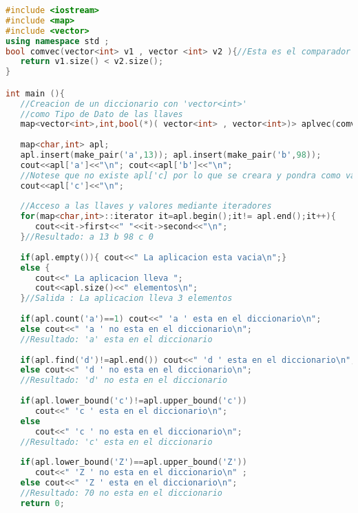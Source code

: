 \begin{lstlisting}[language=C++]
#include <iostream>
#include <map>
#include <vector>
using namespace std ;
bool comvec(vector<int> v1 , vector <int> v2 ){//Esta es el comparador
   return v1.size() < v2.size();
}

int main (){
   //Creacion de un diccionario con 'vector<int>' 
   //como Tipo de Dato de las llaves
   map<vector<int>,int,bool(*)( vector<int> , vector<int>)> aplvec(comvec);
   
   map<char,int> apl;
   apl.insert(make_pair('a',13)); apl.insert(make_pair('b',98));
   cout<<apl['a']<<"\n"; cout<<apl['b']<<"\n";
   //Notese que no existe apl['c] por lo que se creara y pondra como valor 0
   cout<<apl['c']<<"\n";
   
   //Acceso a las llaves y valores mediante iteradores
   for(map<char,int>::iterator it=apl.begin();it!= apl.end();it++){
      cout<<it->first<<" "<<it->second<<"\n";
   }//Resultado: a 13 b 98 c 0
	
   if(apl.empty()){ cout<<" La aplicacion esta vacia\n";}
   else {
      cout<<" La aplicacion lleva ";
      cout<<apl.size()<<" elementos\n";
   }//Salida : La aplicacion lleva 3 elementos
	
   if(apl.count('a')==1) cout<<" 'a ' esta en el diccionario\n";
   else cout<<" 'a ' no esta en el diccionario\n";
   //Resultado: 'a' esta en el diccionario
   
   if(apl.find('d')!=apl.end()) cout<<" 'd ' esta en el diccionario\n";
   else cout<<" 'd ' no esta en el diccionario\n";
   //Resultado: 'd' no esta en el diccionario
	
   if(apl.lower_bound('c')!=apl.upper_bound('c'))
      cout<<" 'c ' esta en el diccionario\n";
   else
      cout<<" 'c ' no esta en el diccionario\n";
   //Resultado: 'c' esta en el diccionario
   
   if(apl.lower_bound('Z')==apl.upper_bound('Z'))
      cout<<" 'Z ' no esta en el diccionario\n" ;
   else cout<<" 'Z ' esta en el diccionario\n";
   //Resultado: 70 no esta en el diccionario
   return 0;
\end{lstlisting}